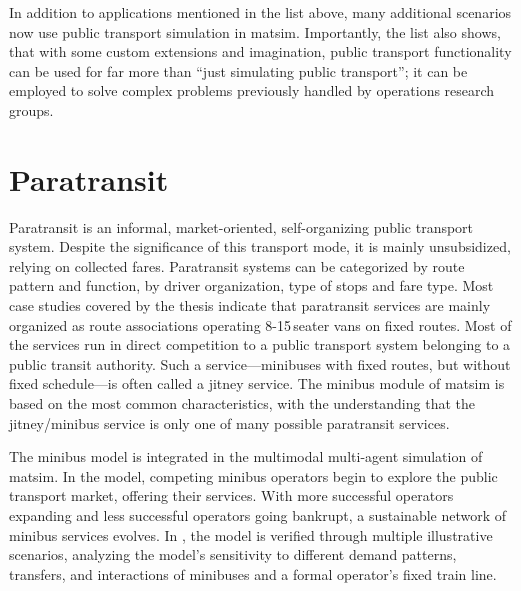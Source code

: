 In addition to applications mentioned in the list above, many additional scenarios now
use public transport simulation in \gls{matsim}. Importantly, the list also
shows, that with some custom extensions and imagination, public transport
functionality can be used for far more than ``just simulating public transport''; it can be
employed to solve complex problems previously handled by operations research
groups.

\chapter{Paratransit}
\label{sec:paratransit}
Paratransit is an informal, market-oriented, self-organizing public transport system. 
Despite the significance of this transport mode, it is mainly unsubsidized, relying on collected fares. 
Paratransit systems can be categorized by route pattern and function, by driver organization, type of stops and fare type. 
Most case studies covered by the \citet[][]{Neumann2014PhD} thesis indicate that paratransit services are mainly 
organized as route associations operating 8-15\,seater vans on fixed routes. Most of the services run in direct competition to a
public transport system belonging to a public transit authority. Such a service---minibuses with fixed routes, but without fixed schedule---is often called a jitney service.
The minibus module of \gls{matsim} is based on the most common characteristics, with the understanding that the jitney/minibus
service is only one of many possible paratransit services.

The minibus model is integrated in the \gls{multimodal} multi-agent simulation of \gls{matsim}. In the model, competing minibus operators begin to explore the public transport market, offering their services. With more successful operators expanding and less successful operators going bankrupt, a sustainable network of minibus services evolves. In \citet[][]{Neumann2014PhD}, the model is verified through multiple illustrative scenarios, analyzing the model's sensitivity to different demand patterns, transfers, and interactions of minibuses and a formal operator's fixed train line.

